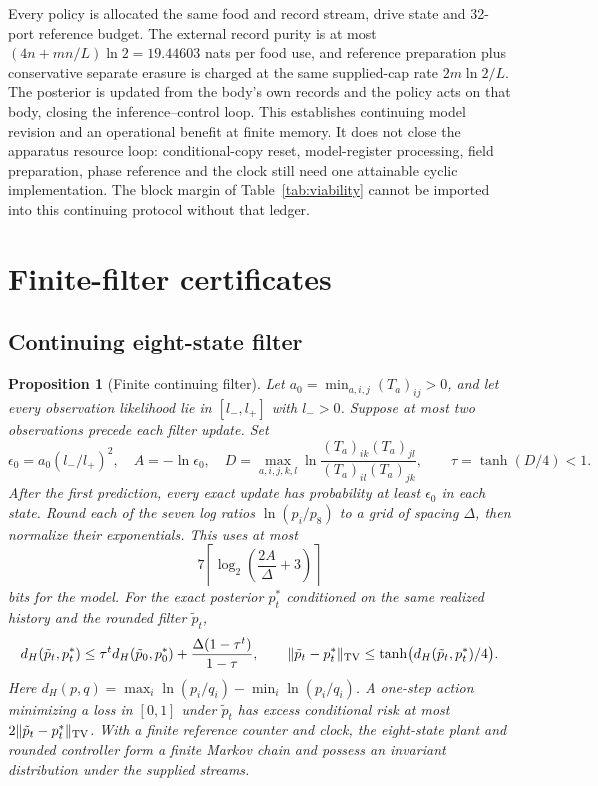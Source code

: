 \documentclass[12pt]{article}
\newtheorem{proposition}[theorem]{Proposition}
\theoremstyle{definition}
\begin{document}
Every policy is allocated the same food and record stream, drive state and 32-port reference budget. The external record purity is at most $(4n+mn/L)\ln2=19.44603$ nats per food use, and reference preparation plus conservative separate erasure is charged at the same supplied-cap rate $2m\ln2/L$. The posterior is updated from the body's own records and the policy acts on that body, closing the inference--control loop. This establishes continuing model revision and an operational benefit at finite memory. It does not close the apparatus resource loop: conditional-copy reset, model-register processing, field preparation, phase reference and the clock still need one attainable cyclic implementation. The block margin of Table~\ref{tab:viability} cannot be imported into this continuing protocol without that ledger.


\section{Finite-filter certificates}\label{app:filter_certificates}

\subsection{Continuing eight-state filter}

\begin{proposition}[Finite continuing filter]
\label{prop:finite_filter}
Let $a_0=\min_{a,i,j}(T_a)_{ij}>0$, and let every observation likelihood lie in $[l_-,l_+]$ with $l_->0$. Suppose at most two observations precede each filter update. Set
\[
 \epsilon_0=a_0(l_-/l_+)^2,\quad A=-\ln\epsilon_0,\quad
 D=\max_{a,i,j,k,l}\ln\frac{(T_a)_{ik}(T_a)_{jl}}{(T_a)_{il}(T_a)_{jk}},
 \qquad \tau=\tanh(D/4)<1.
\]
After the first prediction, every exact update has probability at least $\epsilon_0$ in each state. Round each of the seven log ratios $\ln(p_i/p_8)$ to a grid of spacing $\Delta$, then normalize their exponentials. This uses at most
\[
 7\left\lceil\log_2\left(\frac{2A}{\Delta}+3\right)\right\rceil
\]
bits for the model. For the exact posterior $p_t^*$ conditioned on the same realized history and the rounded filter $\tilde p_t$,
\[
 d_H(\tilde p_t,p_t^*)\le\tau^t d_H(\tilde p_0,p_0^*)+
       \frac{\Delta(1-\tau^t)}{1-\tau},\qquad
 \|\tilde p_t-p_t^*\|_{\rm TV}\le\tanh\bigl(d_H(\tilde p_t,p_t^*)/4\bigr).
\]
Here $d_H(p,q)=\max_i\ln(p_i/q_i)-\min_i\ln(p_i/q_i)$. A one-step action minimizing a loss in $[0,1]$ under $\tilde p_t$ has excess conditional risk at most $2\|\tilde p_t-p_t^*\|_{\rm TV}$. With a finite reference counter and clock, the eight-state plant and rounded controller form a finite Markov chain and possess an invariant distribution under the supplied streams.
\end{proposition}
\end{document}
